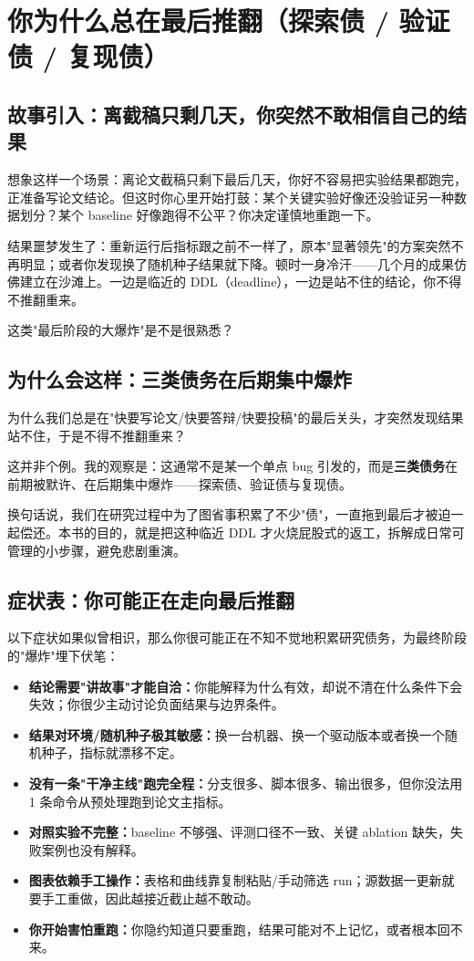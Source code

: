\chapter{你为什么总在最后推翻（探索债 / 验证债 / 复现债）}
\label{ch:why_flip}

\section{故事引入：离截稿只剩几天，你突然不敢相信自己的结果}
想象这样一个场景：离论文截稿只剩下最后几天，你好不容易把实验结果都跑完，正准备写论文结论。但这时你心里开始打鼓：某个关键实验好像还没验证另一种数据划分？某个 baseline 好像跑得不公平？你决定谨慎地重跑一下。

结果噩梦发生了：重新运行后指标跟之前不一样了，原本"显著领先"的方案突然不再明显；或者你发现换了随机种子结果就下降。顿时一身冷汗——几个月的成果仿佛建立在沙滩上。一边是临近的 DDL（deadline），一边是站不住的结论，你不得不推翻重来。

这类"最后阶段的大爆炸"是不是很熟悉？

\section{为什么会这样：三类债务在后期集中爆炸}
为什么我们总是在"快要写论文/快要答辩/快要投稿"的最后关头，才突然发现结果站不住，于是不得不推翻重来？

这并非个例。我的观察是：这通常不是某一个单点 bug 引发的，而是\textbf{三类债务}在前期被默许、在后期集中爆炸——探索债、验证债与复现债。

换句话说，我们在研究过程中为了图省事积累了不少"债"，一直拖到最后才被迫一起偿还。本书的目的，就是把这种临近 DDL 才火烧屁股式的返工，拆解成日常可管理的小步骤，避免悲剧重演。

\section{症状表：你可能正在走向最后推翻}
以下症状如果似曾相识，那么你很可能正在不知不觉地积累研究债务，为最终阶段的"爆炸"埋下伏笔：
\begin{itemize}
  \item \textbf{结论需要"讲故事"才能自洽：}你能解释为什么有效，却说不清在什么条件下会失效；你很少主动讨论负面结果与边界条件。
  \item \textbf{结果对环境/随机种子极其敏感：}换一台机器、换一个驱动版本或者换一个随机种子，指标就漂移不定。
  \item \textbf{没有一条"干净主线"跑完全程：}分支很多、脚本很多、输出很多，但你没法用 1 条命令从预处理跑到论文主指标。
  \item \textbf{对照实验不完整：}baseline 不够强、评测口径不一致、关键 ablation 缺失，失败案例也没有解释。
  \item \textbf{图表依赖手工操作：}表格和曲线靠复制粘贴/手动筛选 run；源数据一更新就要手工重做，因此越接近截止越不敢动。
  \item \textbf{你开始害怕重跑：}你隐约知道只要重跑，结果可能对不上记忆，或者根本回不来。
\end{itemize}

